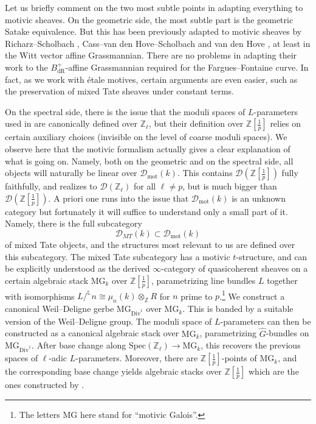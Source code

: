 \documentclass[11pt]{amsart}
\numberwithin{equation}{section}
\numberwithin{theorem}{section}
\theoremstyle{definition}
\begin{document}
Let us briefly comment on the two most subtle points in adapting everything to motivic sheaves. On the geometric side, the most subtle part is the geometric Satake equivalence. But this has been previously adapted to motivic sheaves by Richarz--Scholbach \cite{RicharzScholbach}, Cass--van den Hove--Scholbach \cite{CassvandenHoveScholbach} and van den Hove \cite{vandenHoveWitt}, at least in the Witt vector affine Grassmannian. There are no problems in adapting their work to the $B_{\mathrm{dR}}^+$-affine Grassmannian required for the Fargues--Fontaine curve. In fact, as we work with \'etale motives, certain arguments are even easier, such as the preservation of mixed Tate sheaves under constant terms.

On the spectral side, there is the issue that the moduli spaces of $L$-parameters used in \cite{DHKM} are canonically defined over $\mathbb Z_\ell$, but their definition over $\mathbb Z[\tfrac 1p]$ relies on certain auxiliary choices (invisible on the level of coarse moduli spaces). We observe here that the motivic formalism actually gives a clear explanation of what is going on. Namely, both on the geometric and on the spectral side, all objects will naturally be linear over $\mathcal D_{\mathrm{mot}}(k)$. This contains $\mathcal D(\mathbb Z[\tfrac 1p])$ fully faithfully, and realizes to $\mathcal D(\mathbb Z_\ell)$ for all $\ell\neq p$, but is much bigger than $\mathcal D(\mathbb Z[\tfrac 1p])$. A priori one runs into the issue that $\mathcal D_{\mathrm{mot}}(k)$ is an unknown category but fortunately it will suffice to understand only a small part of it. Namely, there is the full subcategory
\[
\mathcal D_{MT}(k)\subset \mathcal D_{\mathrm{mot}}(k)
\]
of mixed Tate objects, and the structures most relevant to us are defined over this subcategory. The mixed Tate subcategory has a motivic $t$-structure, and can be explicitly understood as the derived $\infty$-category of quasicoherent sheaves on a certain algebraic stack $\mathrm{MG}_k$ over $\mathbb Z[\tfrac 1p]$, parametrizing line bundles $L$ together with isomorphisms $L/^{\mathbb L} n\cong \mu_n(k)\otimes_{\mathbb Z} R$ for $n$ prime to $p$.\footnote{The letters $\mathrm{MG}$ here stand for ``motivic Galois''.} We construct a canonical Weil--Deligne gerbe $\mathrm{MG}_{\mathrm{Div}^1}$ over $\mathrm{MG}_k$. This is banded by a suitable version of the Weil--Deligne group. The moduli space of $L$-parameters can then be constructed as a canonical algebraic stack over $\mathrm{MG}_k$, parametrizing $\widehat{G}$-bundles on $\mathrm{MG}_{\mathrm{Div}^1}$. After base change along $\mathrm{Spec}(\mathbb Z_\ell)\to \mathrm{MG}_k$, this recovers the previous spaces of $\ell$-adic $L$-parameters. Moreover, there are $\mathbb Z[\tfrac 1p]$-points of $\mathrm{MG}_k$, and the corresponding base change yields algebraic stacks over $\mathbb Z[\tfrac 1p]$ which are the ones constructed by \cite{DHKM}.
\end{document}
